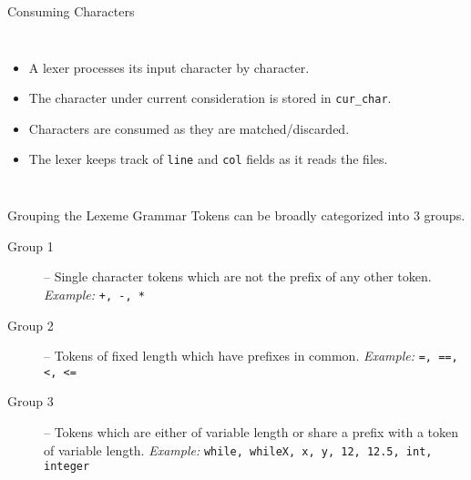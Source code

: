 \documentclass[handout]{beamer}
\newenvironment{code}{%
 \VerbatimEnvironment
 \begin{adjustbox}{max width=\textwidth, max height=0.7\textheight}
 \begin{BVerbatim}
  }{
  \end{BVerbatim}
 \end{adjustbox}
}
\begin{document}
\begin{frame}[fragile]{Consuming Characters}
\begin{columns}
    \begin{itemize}
        \item A lexer processes its input character by character.
        \item The character under current consideration is stored in \texttt{cur\_char}.
        \item Characters are consumed as they are matched/discarded.
        \item The lexer keeps track of \texttt{line} and \texttt{col} fields as it reads the files.
    \end{itemize}

\end{columns}
\end{frame}

\begin{frame}{Grouping the Lexeme Grammar}
    Tokens can be broadly categorized into 3 groups.
    \begin{description}
        \item[Group 1] -- Single character tokens which are not the prefix of any other token.\newline
        {\em Example:} \texttt{+, -, *}
        \vspace{0.5cm}
        
        \item[Group 2] -- Tokens of fixed length which have prefixes in common.\newline
        {\em Example:} \texttt{=, ==, <, <=}
        \vspace{0.5cm}
        
        \item[Group 3] -- Tokens which are either of variable length or share a prefix with a token of variable length.
        \newline
        {\em Example:} \texttt{while, whileX, x, y, 12, 12.5, int, integer}
    \end{description}
\end{frame}
\end{document}
